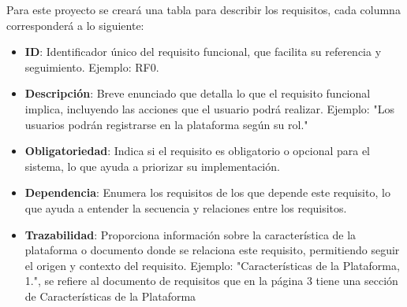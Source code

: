 \documentclass{article}
\begin{document}
	
	Para este proyecto se creará una tabla para describir los requisitos, cada columna corresponderá a lo siguiente:
	
	
	\begin{itemize}
		\item \textbf{ID}: Identificador único del requisito funcional, que facilita su referencia y seguimiento. Ejemplo: RF0.
		
		\item \textbf{Descripción}: Breve enunciado que detalla lo que el requisito funcional implica, incluyendo las acciones que el usuario podrá realizar. Ejemplo: "Los usuarios podrán registrarse en la plataforma según su rol."
		
		\item \textbf{Obligatoriedad}: Indica si el requisito es obligatorio o opcional para el sistema, lo que ayuda a priorizar su implementación. 
		
		\item \textbf{Dependencia}: Enumera los requisitos de los que depende este requisito, lo que ayuda a entender la secuencia y relaciones entre los requisitos.
		
		\item \textbf{Trazabilidad}: Proporciona información sobre la característica de la plataforma o documento donde se relaciona este requisito, permitiendo seguir el origen y contexto del requisito. Ejemplo: "Características de la Plataforma, 1.", se refiere al documento de requisitos que en la página 3 tiene una sección de Características de la Plataforma 
	\end{itemize}
	
\end{document}
